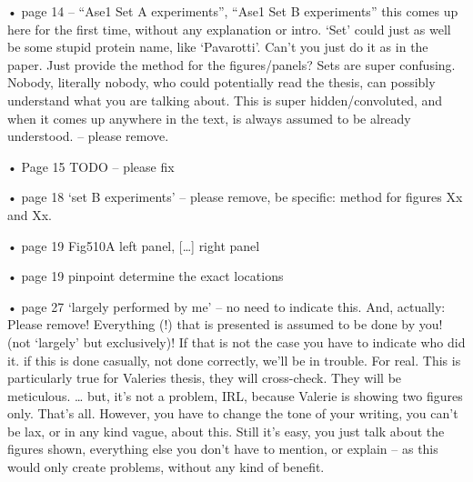 

• page 14 – “Ase1 Set A experiments”, “Ase1 Set B experiments” this comes up here for the first time, without any explanation or intro. ‘Set’ could just as well be some stupid protein name, like ‘Pavarotti’. Can’t you just do it as in the paper. Just provide the method for the figures/panels? Sets are super confusing. Nobody, literally nobody, who could potentially read the thesis, can possibly understand what you are talking about. This is super hidden/convoluted, and when it comes up anywhere in the text, is always assumed to be already understood. – please remove.

• Page 15 TODO – please fix




• page 18  ‘set B experiments’ – please remove, be specific: method for figures Xx and Xx.

• page 19 Fig510A left panel, […] right panel

• page 19 pinpoint determine the exact locations

• page 27 ‘largely performed by me’ – no need to indicate this. And, actually: Please remove! Everything (!) that is presented is assumed to be done by you! (not ‘largely’ but exclusively)! If that is not the case you have to indicate who did it. if this is done casually, not done correctly, we’ll be in trouble. For real. This is particularly true for Valeries thesis, they will cross-check. They will be meticulous. … but, it’s not a problem, IRL, because Valerie is showing two figures only. That’s all. However, you have to change the tone of your writing, you can’t be lax, or in any kind vague, about this. Still it’s easy, you just talk about the figures shown, everything else you don’t have to mention, or explain – as this would only create problems, without any kind of benefit.

